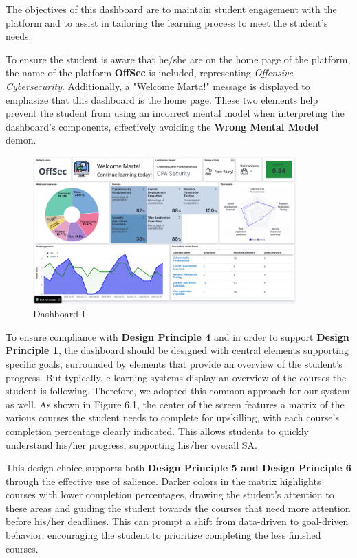 The objectives of this dashboard are to maintain student engagement with the platform and to assist in tailoring the learning process to meet the student's needs.

To ensure the student is aware that he/she are on the home page of the platform, the name of the platform \textbf{OffSec} is included, representing \textit{Offensive Cybersecurity}. Additionally, a "Welcome Marta!" message is displayed to emphasize that this dashboard is the home page. These two elements help prevent the student from using an incorrect mental model when interpreting the dashboard's components, effectively avoiding the \textbf{Wrong Mental Model} demon.

\begin{figure}[H]
    \centering
    \includegraphics[width=0.9\textwidth]{assets/dashboard_1.png}
    \caption{Dashboard I}
    \label{fig:dashboard_1}
\end{figure}

To ensure compliance with \textbf{Design Principle 4} and in order to support \textbf{Design Principle 1}, the dashboard should be designed with central elements supporting specific goals, 
surrounded by elements that provide an overview of the student's progress. But typically, e-learning systems display an overview of the courses the student is following. 
Therefore, we adopted this common approach for our system as well.
As shown in Figure 6.1, the center of the screen features a matrix of the various courses the student needs to complete for upskilling, 
with each course's completion percentage clearly indicated. This allows students to quickly understand his/her progress, supporting his/her 
overall SA.

This design choice supports both \textbf{Design Principle 5 and Design Principle 6} through the effective use of salience. 
Darker colors in the matrix highlights courses with lower completion percentages, drawing the student's attention to these areas and guiding the student towards the courses that need more
attention before his/her deadlines. This can prompt a shift from data-driven to goal-driven behavior, encouraging the student to prioritize completing the less finished courses. 

